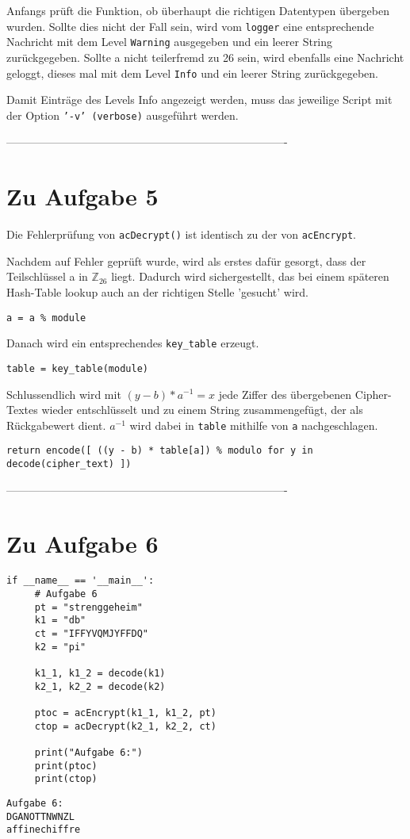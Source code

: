 \documentclass[12pt]{article}
\begin{document}
Anfangs prüft die Funktion, ob überhaupt die richtigen Datentypen übergeben wurden. Sollte dies nicht der Fall sein, wird vom \texttt{logger} eine entsprechende Nachricht mit dem Level \texttt{Warning} ausgegeben und ein leerer String zurückgegeben.
Sollte a nicht teilerfremd zu 26 sein, wird ebenfalls eine Nachricht geloggt, dieses mal mit dem Level \texttt{Info} und ein leerer String zurückgegeben.

Damit Einträge des Levels Info angezeigt werden, muss das jeweilige Script mit der Option \texttt{'-v' (verbose)} ausgeführt werden. 

%
 ----------------------------------------------------------------------------
\section{Zu Aufgabe 5}
Die Fehlerprüfung von \texttt{acDecrypt()} ist identisch zu der von \texttt{acEncrypt}. 

Nachdem auf Fehler geprüft wurde, wird als erstes dafür gesorgt, dass der Teilschlüssel a in $\mathbb{Z}_{26}$ liegt. Dadurch wird sichergestellt, das bei einem späteren Hash-Table lookup auch an der richtigen Stelle 'gesucht' wird.
\begin{lstlisting}
a = a % module
\end{lstlisting}

Danach wird ein entsprechendes \texttt{key\_table} erzeugt.
\begin{lstlisting}
table = key_table(module)
\end{lstlisting}

Schlussendlich wird mit $(y - b) * a^{-1} = x$ jede Ziffer des übergebenen Cipher-Textes wieder entschlüsselt und zu einem String zusammengefügt, der als Rückgabewert dient. $a^{-1}$ wird dabei in \texttt{table} mithilfe von \texttt{a} nachgeschlagen.
\begin{lstlisting}
return encode([ ((y - b) * table[a]) % modulo for y in decode(cipher_text) ])
\end{lstlisting}

%
 ----------------------------------------------------------------------------
\section{Zu Aufgabe 6}
\begin{lstlisting}
if __name__ == '__main__':
     # Aufgabe 6 
     pt = "strenggeheim"
     k1 = "db"
     ct = "IFFYVQMJYFFDQ"
     k2 = "pi"
 
     k1_1, k1_2 = decode(k1)
     k2_1, k2_2 = decode(k2)
 
     ptoc = acEncrypt(k1_1, k1_2, pt)
     ctop = acDecrypt(k2_1, k2_2, ct)
 
     print("Aufgabe 6:")
     print(ptoc)
     print(ctop)
\end{lstlisting}
\begin{lstlisting}
Aufgabe 6:
DGANOTTNWNZL
affinechiffre
\end{lstlisting}
\end{document}
